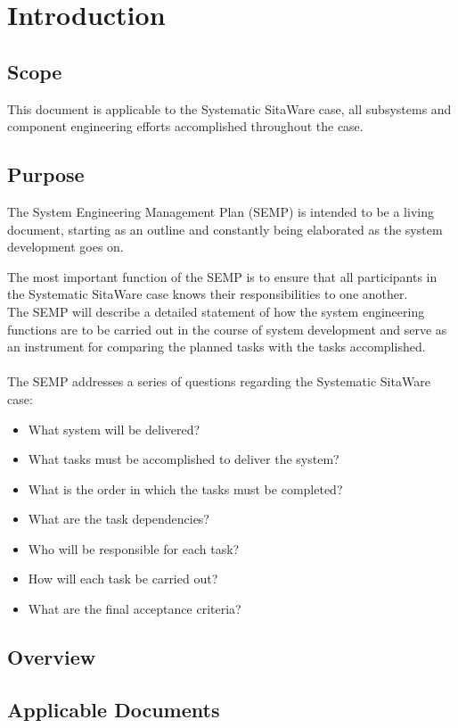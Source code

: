 %
\thispagestyle{fancy}
\chapter{Introduction}
\label{chp:intro}


\section{Scope}
This document is applicable to the Systematic SitaWare case, all subsystems and component engineering efforts accomplished throughout the case.

\section{Purpose}
The System Engineering Management Plan (SEMP) is intended to be a living document, starting as an outline and constantly being elaborated as the system development goes on.

The most important function of the SEMP is to ensure that all participants in the Systematic SitaWare case knows their responsibilities to one another. \\
The SEMP will describe a detailed statement of how the system engineering functions are to be carried out in the course of system development and serve as an instrument for comparing the planned tasks with the tasks accomplished.\\\\
The SEMP addresses a series of questions regarding the Systematic SitaWare case:
\begin{itemize}
    \item What system will be delivered?
    \item What tasks must be accomplished to deliver the system?
    \item What is the order in which the tasks must be completed?
    \item What are the task dependencies?
    \item Who will be responsible for each task?
    \item How will each task be carried out?
    \item What are the final acceptance criteria?
\end{itemize}

\section{Overview}


\section{Applicable Documents}
